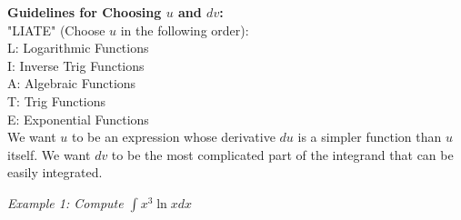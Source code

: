\documentclass{article}
\begin{document}
            \noindent \textbf{Guidelines for Choosing $u$ and $dv$:} \\
            \noindent "LIATE" (Choose $u$ in the following order): \\
            \noindent L: Logarithmic Functions \\
            \noindent I: Inverse Trig Functions \\
            \noindent A: Algebraic Functions \\
            \noindent T: Trig Functions \\
            \noindent E: Exponential Functions \\

            \noindent We want $u$ to be an expression whose derivative $du$ is a simpler function
            than $u$ itself. We want $dv$ to be the most complicated part of the integrand that
            can be easily integrated.

            \pagebreak
            \noindent \color{blue} \textit{Example 1: Compute $\int x^3\ln{x}dx$} \color{black}
\end{document}
